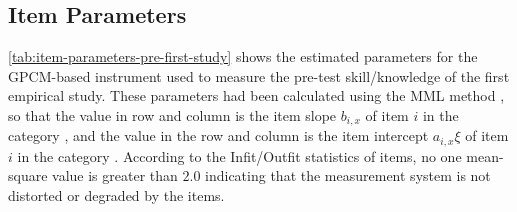 
\subsection{Item Parameters}

\autoref{tab:item-parameters-pre-first-study} shows the estimated parameters for the GPCM-based instrument used to measure the pre-test skill/knowledge of the first empirical study.
These parameters had been calculated using the MML method \cite{BockAitkin1981}, so that the value in row  and column  is the item slope $b_{i,x}$ of item $i$ in the category , and the value in the row  and column  is the item intercept $a_{i,x}\xi$ of item $i$ in the category .
According to the Infit/Outfit statistics of items, no one mean-square value is greater than $2.0$ indicating that the measurement system is not distorted or degraded by the items.


